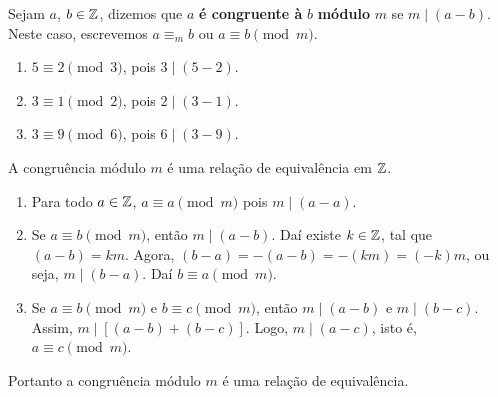 \begin{definicao}
    Sejam $a$, $b \in\mathbb{Z}$, dizemos que $a$ \textbf{é congruente \`a} $b$ \textbf{módulo} $m$ se $m \mid (a-b)$. Neste caso, escrevemos $a\equiv_{m} b$ ou $a\equiv b \pmod{m}$.
\end{definicao}

\begin{exemplos}
    \begin{enumerate}[label={\arabic*})]
        \item $5\equiv 2 \pmod{3}$, pois $3 \mid (5-2)$.
        \item $3\equiv 1 \pmod{2}$, pois $2\mid (3-1)$.
        \item $3\equiv 9 \pmod{6}$, pois $6\mid (3-9)$.
    \end{enumerate}
\end{exemplos}

\begin{proposicao}
    A congruência módulo $m$ é uma relação de equivalência em $\mathbb{Z}$.
\end{proposicao}
\begin{prova}
    \begin{enumerate}[label={\roman*})]
        \item Para todo $a \in \mathbb{Z}$, $a\equiv a\pmod{m}$ pois $m\mid (a-a)$.
        \item Se $a\equiv b\pmod{m}$, então $m\mid (a - b)$. Daí existe $k \in \mathbb{Z}$, tal que $(a - b) = km$. Agora, $(b - a) = -(a - b) = -(km) = (-k)m$, ou seja, $m \mid (b - a)$. Daí $b\equiv a \pmod{m}$.
        \item Se $a\equiv b\pmod{m}$ e $b\equiv c\pmod{m}$, então $m\mid (a-b)$ e $m\mid (b-c)$. Assim, $m\mid [(a-b)+(b-c)]$. Logo, $m\mid (a-c)$, isto é, $a\equiv c\pmod{m}$.
    \end{enumerate}

    Portanto a congruência módulo $m$ é uma relação de equivalência.
\end{prova}

